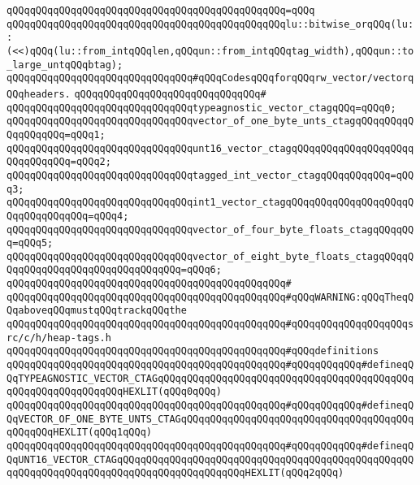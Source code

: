\verb|qQQqqQQqqQQqqQQqqQQqqQQqqQQqqQQqqQQqqQQqqQQqqQQq=qQQq|\newline
\verb|qQQqqQQqqQQqqQQqqQQqqQQqqQQqqQQqqQQqqQQqqQQqqQQqlu::bitwise_orqQQq(lu::(<<)qQQq(lu::from_intqQQqlen,qQQqun::from_intqQQqtag_width),qQQqun::to_large_untqQQqbtag);|\newline
\newline
\verb|qQQqqQQqqQQqqQQqqQQqqQQqqQQqqQQq#qQQqCodesqQQqforqQQqrw_vector/vectorqQQqheaders.|\newline
\verb|qQQqqQQqqQQqqQQqqQQqqQQqqQQqqQQq#|\newline
\verb|qQQqqQQqqQQqqQQqqQQqqQQqqQQqqQQqtypeagnostic_vector_ctagqQQq=qQQq0;|\newline
\verb|qQQqqQQqqQQqqQQqqQQqqQQqqQQqqQQqvector_of_one_byte_unts_ctagqQQqqQQqqQQqqQQqqQQq=qQQq1;|\newline
\verb|qQQqqQQqqQQqqQQqqQQqqQQqqQQqqQQqunt16_vector_ctagqQQqqQQqqQQqqQQqqQQqqQQqqQQqqQQq=qQQq2;|\newline
\verb|qQQqqQQqqQQqqQQqqQQqqQQqqQQqqQQqtagged_int_vector_ctagqQQqqQQqqQQq=qQQq3;|\newline
\verb|qQQqqQQqqQQqqQQqqQQqqQQqqQQqqQQqint1_vector_ctagqQQqqQQqqQQqqQQqqQQqqQQqqQQqqQQqqQQq=qQQq4;|\newline
\verb|qQQqqQQqqQQqqQQqqQQqqQQqqQQqqQQqvector_of_four_byte_floats_ctagqQQqqQQq=qQQq5;|\newline
\verb|qQQqqQQqqQQqqQQqqQQqqQQqqQQqqQQqvector_of_eight_byte_floats_ctagqQQqqQQqqQQqqQQqqQQqqQQqqQQqqQQqqQQq=qQQq6;|\newline
\verb|qQQqqQQqqQQqqQQqqQQqqQQqqQQqqQQqqQQqqQQqqQQqqQQq#|\newline
\verb|qQQqqQQqqQQqqQQqqQQqqQQqqQQqqQQqqQQqqQQqqQQqqQQq#qQQqWARNING:qQQqTheqQQqaboveqQQqmustqQQqtrackqQQqthe|\newline
\verb|qQQqqQQqqQQqqQQqqQQqqQQqqQQqqQQqqQQqqQQqqQQqqQQq#qQQqqQQqqQQqqQQqqQQqsrc/c/h/heap-tags.h|\newline
\verb|qQQqqQQqqQQqqQQqqQQqqQQqqQQqqQQqqQQqqQQqqQQqqQQq#qQQqdefinitions|\newline
\verb|qQQqqQQqqQQqqQQqqQQqqQQqqQQqqQQqqQQqqQQqqQQqqQQq#qQQqqQQqqQQq#defineqQQqTYPEAGNOSTIC_VECTOR_CTAGqQQqqQQqqQQqqQQqqQQqqQQqqQQqqQQqqQQqqQQqqQQqqQQqqQQqqQQqqQQqqQQqHEXLIT(qQQq0qQQq)|\newline
\verb|qQQqqQQqqQQqqQQqqQQqqQQqqQQqqQQqqQQqqQQqqQQqqQQq#qQQqqQQqqQQq#defineqQQqVECTOR_OF_ONE_BYTE_UNTS_CTAGqQQqqQQqqQQqqQQqqQQqqQQqqQQqqQQqqQQqqQQqqQQqqQQqHEXLIT(qQQq1qQQq)|\newline
\verb|qQQqqQQqqQQqqQQqqQQqqQQqqQQqqQQqqQQqqQQqqQQqqQQq#qQQqqQQqqQQq#defineqQQqUNT16_VECTOR_CTAGqQQqqQQqqQQqqQQqqQQqqQQqqQQqqQQqqQQqqQQqqQQqqQQqqQQqqQQqqQQqqQQqqQQqqQQqqQQqqQQqqQQqqQQqqQQqHEXLIT(qQQq2qQQq)|\newline
